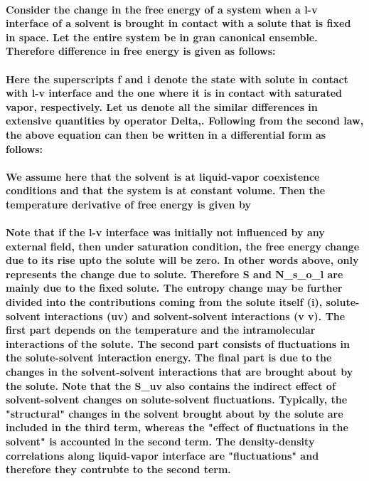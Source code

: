 \documentclass[a4paper,12pt,single,pdftex]{scrartcl}
\begin{document}
\label{ID_106467715}\paragraph{Consider the change in the free energy of a system when a l-v interface of a solvent is brought in contact with a solute that is fixed in space. Let the entire system be in gran canonical ensemble. Therefore difference in free energy is given as follows:}

\label{ID_1903608681}\paragraph{Here the superscripts f and i denote the state with solute in contact with l-v interface and the one where it is in contact with saturated vapor, respectively. Let us denote all the similar differences in extensive quantities by operator Delta,. Following from the second law, the above equation can then be written in a differential form as follows:}

\label{ID_1377597507}\paragraph{We assume here that the solvent is at liquid-vapor coexistence conditions and that the system is at constant volume. Then the temperature derivative of free energy is given by}

\label{ID_863437212}\paragraph{Note that if the l-v interface was initially not influenced by any external field, then under saturation condition, the free energy change due to its rise upto the solute will be zero. In other words \Delta \mu above, only represents the change due to solute. Therefore \Delta S and \Delta N_s_o_l are mainly due to the fixed solute. The entropy change may be further divided into the contributions coming from the solute itself (i), solute-solvent interactions (uv) and solvent-solvent interactions (v v). The first part depends on the temperature and the intramolecular interactions of the solute. The second part consists of fluctuations in the solute-solvent interaction energy. The final part is due to the changes in the solvent-solvent interactions that are brought about by the solute. Note that the \Delta S_{uv} also contains the indirect effect of solvent-solvent changes on solute-solvent fluctuations. Typically, the "structural" changes in the solvent brought about by the solute are included in the third term, whereas the "effect of fluctuations in the solvent" is accounted in the second term. The density-density correlations along liquid-vapor interface are "fluctuations" and therefore they contrubte to the second term.}
\end{document}
